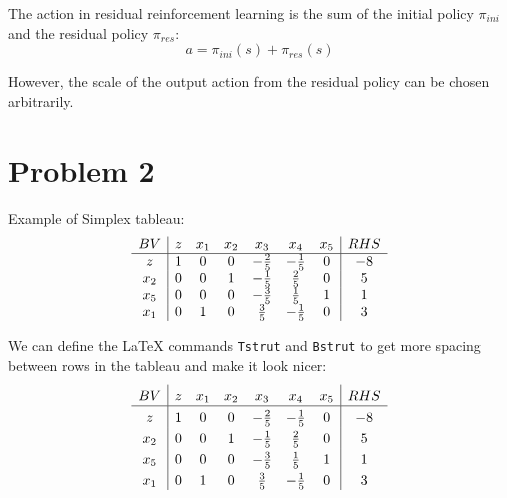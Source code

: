 \documentclass{article}
\newcommand\Tstrut{\rule{0pt}{2.6ex}}         %
\newcommand\Bstrut{\rule[-0.9ex]{0pt}{0pt}}   %
\begin{document}
The action in residual reinforcement learning is the sum of the initial policy $\pi_{ini}$ and the residual policy $\pi_{res}$:
\begin{equation}
	a=\pi_{ini}(s)+\pi_{res}(s)
\end{equation}

However, the scale of the output action from the residual policy can be chosen arbitrarily.





\pagebreak
\section{Problem 2}

Example of Simplex tableau:
\begin{align}
    \begin{array}{c | cccccc | c}
         BV  & z & x_1 & x_2 & x_3 & x_4 & x_5 & RHS \\ 
         \hline %
         z   & 1 & 0 & 0 & -\tfrac{2}{5} & -\tfrac{1}{5} & 0 & -8 \\
         x_2 & 0 & 0 & 1 & -\tfrac{1}{5} & \tfrac{2}{5}  & 0 & 5 \\
         x_5 & 0 & 0 & 0 & -\tfrac{3}{5} & \tfrac{1}{5}  & 1 & 1 \\
         x_1 & 0 & 1 & 0 & \tfrac{3}{5}  & -\tfrac{1}{5} & 0 & 3
    \end{array}
\end{align}


We can define the \LaTeX{} commands \texttt{Tstrut} and \texttt{Bstrut} to get more spacing between rows in the tableau and make it look nicer:
\begin{align}
    \begin{array}{c | cccccc | c}
         BV  & z & x_1 & x_2 & x_3 & x_4 & x_5 & RHS \Tstrut\Bstrut \\ 
         \hline
         z   & 1 & 0 & 0 & -\tfrac{2}{5} & -\tfrac{1}{5} & 0 & -8 \Tstrut\Bstrut \\
         x_2 & 0 & 0 & 1 & -\tfrac{1}{5} & \tfrac{2}{5}  & 0 & 5  \Tstrut\Bstrut \\
         x_5 & 0 & 0 & 0 & -\tfrac{3}{5} & \tfrac{1}{5}  & 1 & 1  \Tstrut\Bstrut \\
         x_1 & 0 & 1 & 0 & \tfrac{3}{5}  & -\tfrac{1}{5} & 0 & 3  \Tstrut\Bstrut
    \end{array}
\end{align}
\end{document}
